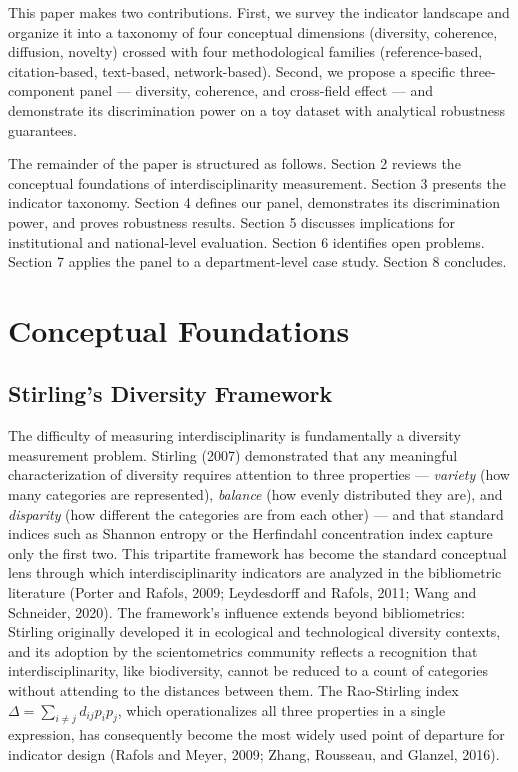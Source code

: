 \documentclass[
]{article}
\begin{document}
This paper makes two contributions. First, we survey the indicator
landscape and organize it into a taxonomy of four conceptual dimensions
(diversity, coherence, diffusion, novelty) crossed with four
methodological families (reference-based, citation-based, text-based,
network-based). Second, we propose a specific three-component panel ---
diversity, coherence, and cross-field effect --- and demonstrate its
discrimination power on a toy dataset with analytical robustness
guarantees.

The remainder of the paper is structured as follows. Section 2 reviews
the conceptual foundations of interdisciplinarity measurement. Section 3
presents the indicator taxonomy. Section 4 defines our panel,
demonstrates its discrimination power, and proves robustness results.
Section 5 discusses implications for institutional and national-level
evaluation. Section 6 identifies open problems. Section 7 applies the
panel to a department-level case study. Section 8 concludes.

\hypertarget{conceptual-foundations}{%
\section{Conceptual Foundations}\label{conceptual-foundations}}

\hypertarget{stirlings-diversity-framework}{%
\subsection{Stirling's Diversity
Framework}\label{stirlings-diversity-framework}}

The difficulty of measuring interdisciplinarity is fundamentally a
diversity measurement problem. Stirling (2007) demonstrated that any
meaningful characterization of diversity requires attention to three
properties --- \emph{variety} (how many categories are represented),
\emph{balance} (how evenly distributed they are), and \emph{disparity}
(how different the categories are from each other) --- and that standard
indices such as Shannon entropy or the Herfindahl concentration index
capture only the first two. This tripartite framework has become the
standard conceptual lens through which interdisciplinarity indicators
are analyzed in the bibliometric literature (Porter and Rafols, 2009;
Leydesdorff and Rafols, 2011; Wang and Schneider, 2020). The framework's
influence extends beyond bibliometrics: Stirling originally developed it
in ecological and technological diversity contexts, and its adoption by
the scientometrics community reflects a recognition that
interdisciplinarity, like biodiversity, cannot be reduced to a count of
categories without attending to the distances between them. The
Rao-Stirling index \(\Delta = \sum_{i \neq j} d_{ij} p_i p_j\), which
operationalizes all three properties in a single expression, has
consequently become the most widely used point of departure for
indicator design (Rafols and Meyer, 2009; Zhang, Rousseau, and Glanzel,
2016).
\end{document}
